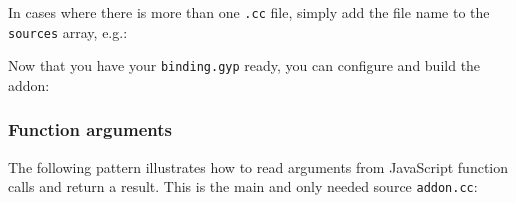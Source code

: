 In cases where there is more than one \texttt{.cc} file, simply add the
file name to the \texttt{sources} array, e.g.:

\begin{Shaded}
\begin{Highlighting}[]
\NormalTok{: [}\NormalTok{, }\NormalTok{]}
\end{Highlighting}
\end{Shaded}

Now that you have your \texttt{binding.gyp} ready, you can configure and
build the addon:

\begin{Shaded}
\begin{Highlighting}[]
\end{Highlighting}
\end{Shaded}

\subsubsection{Function arguments}\label{function-arguments}

The following pattern illustrates how to read arguments from JavaScript
function calls and return a result. This is the main and only needed
source \texttt{addon.cc}:

